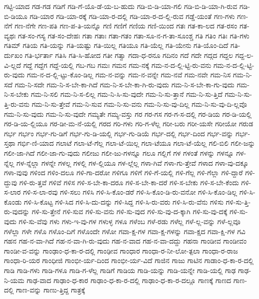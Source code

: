 {ಗಟ್ಟಿ-ಯಾದ
ಗಡ-ಗಡ
ಗಡಿಗೆ
ಗಡಿ-ಗೆ-ಯೊ-ಡೆ-ಯ-ಬ-ಹುದು
ಗಡಿ-ಬಿ-ಡಿ-ಯಾ-ಗಲಿ
ಗಡಿ-ಬಿ-ಡಿ-ಯಾ-ಗಿ-ರುವ
ಗಡಿ-ಬಿ-ಡಿಯೂ
ಗಡಿ-ಯಾರ
ಗಡಿ-ಯಾ-ರಕ್ಕೆ
ಗಡಿ-ಯಾ-ರ-ದಲ್ಲಿ
ಗಡಿ-ಯಾ-ರ-ದ-ಲ್ಲಿ-ರುವ
ಗಡ್ಡೆ-ಯಂತೆ
ಗಣ-ಗಳು
ಗಣ-ನೆಗೆ
ಗಣ-ನೆಗೇ
ಗಣ-ಪತಿ
ಗಣ-ಪ-ತಿ-ಯನ್ನೊ
ಗಣಿ
ಗಣಿಗೆ
ಗಣಿಯ
ಗಣಿ-ಯಿಂದ
ಗತಃ
ಗತ-ಕಾ-ಲದ
ಗತ-ರಸಂ
ಗತ-ವ್ಯಥಃ
ಗತ-ಸಂ-ಗಸ್ಯ
ಗತ-ಸಂ-ದೇಹಃ
ಗತಾ
ಗತಾಃ
ಗತಾ-ಗತಂ
ಗತಾ-ಸೂ-ನ-ಗ-ತಾ-ಸೂಂಶ್ಚ
ಗತಿ
ಗತಿಂ
ಗತಿಃ
ಗತಿ-ಗಳು
ಗತಿಮ್
ಗತಿಯ
ಗತಿ-ಯನ್ನು
ಗತಿ-ಯಷ್ಟು
ಗತಿ-ಯಿಲ್ಲ
ಗತಿಯೂ
ಗತಿ-ಯೆಲ್ಲ
ಗತಿ-ಯೇನು
ಗತಿ-ಯೊಂ-ದಿದೆ
ಗತಿ-ರ್ದುಖಂ
ಗತಿ-ರ್ಭರ್ತಾ
ಗತಿಸಿ
ಗತಿ-ಸಿ-ಹೋದ
ಗತೀ
ಗತ್ವಾ
ಗದಾ-ಧ-ರನೂ
ಗದಿನಂ
ಗದೆ
ಗದೇ
ಗದ್ಗದ
ಗದ್ದಲ
ಗದ್ದ-ಲ-ವಿ-ಲ್ಲದೆ
ಗದ್ದೆ
ಗದ್ದೆಗ
ಗದ್ದೆ-ಯಲ್ಲಿ
ಗಬ-ಗಬ
ಗಮಃ
ಗಮನ
ಗಮ-ನಕ್ಕೆ
ಗಮ-ನ-ದ-ಲ್ಲಿ-ಟ್ಟಿ-ರು-ವನು
ಗಮ-ನ-ದ-ಲ್ಲಿ-ಟ್ಟಿ-ರು-ವುದು
ಗಮ-ನ-ದ-ಲ್ಲಿ-ಟ್ಟು-ಕೊಂ-ಡಿಲ್ಲ
ಗಮ-ನ-ವನ್ನು
ಗಮ-ನ-ವನ್ನೇ
ಗಮ-ನವೆ
ಗಮ-ನವೇ
ಗಮ-ನಿಸ
ಗಮ-ನಿ-ಸದೆ
ಗಮ-ನಿ-ಸದೇ
ಗಮ-ನಿ-ಸ-ಬೇ-ಕಾ-ಗಿದೆ
ಗಮ-ನಿ-ಸ-ಬೇ-ಕಾ-ಗಿ-ರು-ವುದು
ಗಮ-ನಿ-ಸ-ಬೇ-ಕಾ-ಗು-ವುದು
ಗಮ-ನಿ-ಸ-ಬೇಕು
ಗಮ-ನಿ-ಸಲಿ
ಗಮ-ನಿ-ಸ-ಲಿಲ್ಲ
ಗಮ-ನಿ-ಸಿ-ಸು-ವುದೇ
ಗಮ-ನಿ-ಸು-ತ್ತಾನೆ
ಗಮ-ನಿ-ಸು-ತ್ತಿದೆ
ಗಮ-ನಿ-ಸು-ತ್ತಿ-ರು-ವನು
ಗಮ-ನಿ-ಸು-ತ್ತೇವೆ
ಗಮ-ನಿ-ಸುವ
ಗಮ-ನಿ-ಸು-ವನು
ಗಮ-ನಿ-ಸು-ವು-ದಿಲ್ಲ
ಗಮ-ನಿ-ಸು-ವು-ದಿ-ಲ್ಲವೊ
ಗಮ-ನಿ-ಸು-ವುದು
ಗಮ-ನಿ-ಸು-ವುದೇ
ಗಮ್ಯತೇ
ಗಮ್ಯ-ವಸ್ತು
ಗರ
ಗರ-ಗಸ
ಗರ-ಗ-ಸ-ದಲ್ಲಿ
ಗರ-ಡಿಯ
ಗರ-ಡಿ-ಯಲ್ಲಿ
ಗರ-ಡಿ-ಯ-ಲ್ಲಿಯೂ
ಗರ-ಡೀ-ಮ-ನೆ-ಯಲ್ಲಿ
ಗರದ
ಗರಿ-ಗಳು
ಗರಿ-ಗ-ಳೆಲ್ಲ
ಗರೀ-ಬರು
ಗರೀ-ಯಸೇ
ಗರೀಯೋ
ಗರುಡ
ಗರ್ಭ
ಗರ್ಭಂ
ಗರ್ಭ-ಗು-ಡಿಗೆ
ಗರ್ಭ-ಗು-ಡಿ-ಯಲ್ಲಿ
ಗರ್ಭ-ಗು-ಡಿಯೆ
ಗರ್ಭ-ದಲ್ಲಿ
ಗರ್ಭ-ದಿಂದ
ಗರ್ಭ-ವನ್ನು
ಗರ್ಭ-ಸ್ತಥಾ
ಗರ್ಭಿ-ಣಿ-ಯಾದ
ಗಲಾಟೆ
ಗಲಾ-ಟೆ-ಗೆಲ್ಲ
ಗಲಾ-ಟೆ-ಯಿಲ್ಲ
ಗಲಾ-ಟೆಯೂ
ಗಲಾ-ಟೆ-ಯೆಲ್ಲ
ಗಲಿ-ಬಿಲಿ
ಗಲೀ-ಜನ್ನು
ಗಲೀ-ಜಾ-ಗಿದೆ
ಗಲೀ-ಜಾ-ಗು-ವುದು
ಗಲೀಜು
ಗಲೀ-ಜು-ಗಳನ್ನೂ
ಗಲೂ
ಗಲ್ಲಿಗೆ
ಗಳ
ಗಳಂತೆ
ಗಳನ್ನು
ಗಳನ್ನೂ
ಗಳ-ನ್ನೆಲ್ಲ
ಗಳ-ನ್ನೆಲ್ಲಾ
ಗಳನ್ನೇ
ಗಳಲ್ಲ
ಗಳಲ್ಲಿ
ಗಳ-ಲ್ಲಿಯೂ
ಗಳ-ಲ್ಲೆಲ್ಲ
ಗಳಾ-ಗಿವೆ
ಗಳಾ-ಗು-ತ್ತೇವೆ
ಗಳಾದ
ಗಳಾ-ವು-ದಕ್ಕೂ
ಗಳಾ-ವುವು
ಗಳಿಂದ
ಗಳಿಂ-ದಲೂ
ಗಳಿ-ಗಾ-ದರೋ
ಗಳಿಗೂ
ಗಳಿಗೆ
ಗಳಿ-ಗೆ-ಯಲ್ಲಿ
ಗಳಿ-ಗೆಲ್ಲ
ಗಳಿ-ಗೆಲ್ಲಾ
ಗಳಿ-ದ್ದಾರೆ
ಗಳಿ-ದ್ದುವು
ಗಳಿ-ರು-ತ್ತವೆ
ಗಳಿವೆ
ಗಳಿಸ
ಗಳಿ-ಸ-ಬೇ-ಕಾ-ದರೂ
ಗಳಿ-ಸ-ಬೇ-ಕಾ-ದರೆ
ಗಳಿ-ಸ-ಬೇಕು
ಗಳಿ-ಸ-ಬೇ-ಕೆಂದು
ಗಳಿ-ಸ-ಲಾರ
ಗಳಿ-ಸ-ಲಾ-ರವು
ಗಳಿ-ಸಲು
ಗಳಿಸಿ
ಗಳಿ-ಸಿ-ಕೊಂ-ಡರೆ
ಗಳಿ-ಸಿ-ಕೊಂ-ಡಿ-ರು-ವನೋ
ಗಳಿ-ಸಿ-ಕೊಂ-ಡಿಲ್ಲ
ಗಳಿ-ಸಿ-ಕೊಂಡು
ಗಳಿ-ಸಿ-ಕೊಟ್ಟ
ಗಳಿ-ಸಿದ
ಗಳಿ-ಸಿ-ದು-ದನ್ನು
ಗಳಿ-ಸಿದ್ದ
ಗಳಿ-ಸಿ-ರು-ವರು
ಗಳಿ-ಸಿ-ರು-ವೆನು
ಗಳಿಸು
ಗಳಿ-ಸು-ತ್ತಿ-ರು-ವುದನ್ನು
ಗಳಿ-ಸು-ತ್ತೇನೆ
ಗಳಿ-ಸುವ
ಗಳಿ-ಸು-ವನು
ಗಳಿ-ಸು-ವುದ
ಗಳಿ-ಸು-ವು-ದ-ಕ್ಕಾಗಿ
ಗಳಿ-ಸು-ವು-ದಕ್ಕೆ
ಗಳಿ-ಸು-ವುದು
ಗಳಿ-ಸು-ವೆವು
ಗಳು
ಗಳು-ಇ-ವು-ಗಳ
ಗಳುಳ್ಳ
ಗಳೂ
ಗಳೆಂಬ
ಗಳೆ-ರಡು
ಗಳೆಲ್ಲ
ಗಳೆ-ಲ್ಲ-ವನ್ನು
ಗಳೆ-ಲ್ಲವೂ
ಗಳೆಲ್ಲಾ
ಗಳೇ
ಗಳೊ
ಗಳೊಂ-ದಿಗೆ
ಗಳೊಂದೇ
ಗಳೋ
ಗವಾ-ಕ್ಷ-ಗಳ
ಗವಾ-ಕ್ಷ-ಗಳನ್ನು
ಗವಾ-ಕ್ಷದ
ಗವಾ-ಕ್ಷಿ-ಗಳ
ಗವಿ
ಗಹನ
ಗಹ-ನ-ವಾ-ಗಿದೆ
ಗಹ-ನ-ವಾ-ಗಿ-ರು-ವುದು
ಗಹ-ನ-ವಾದ
ಗಹ-ನ-ವಾ-ದದ್ದು
ಗಹನಾ
ಗಾಂಡೀವ
ಗಾಂಡೀವಂ
ಗಾಂಡೀ-ವ-ವನ್ನು
ಗಾಂಢಾಂ-ಧ-ಕಾ-ರ-ದಲ್ಲಿ
ಗಾಂಢೀವ
ಗಾಂಧಾರ
ಗಾಂಧಾ-ರ-ನೀ-ಲೋ-ತ್ಪಲಾ
ಗಾಂಧಾ-ರ-ರಾಜ
ಗಾಂಧಾ-ರಿ-ಯರ
ಗಾಂಧೀಜಿ
ಗಾಂಭೀ-ರ್ಯ-ದಿಂದ
ಗಾಂಭೀ-ರ್ಯ-ವಿದೆ
ಗಾಜಿನ
ಗಾಜು
ಗಾಟಿನ
ಗಾಡಾಂ-ಧ-ಕಾ-ರ-ದಲ್ಲಿ
ಗಾಡಿ
ಗಾಡಿ-ಗಳು
ಗಾಡಿ-ಗಳೂ
ಗಾಡಿ-ಗ-ಳೆಲ್ಲ
ಗಾಡಿಗೆ
ಗಾಡಿಯ
ಗಾಡಿ-ಯನ್ನು
ಗಾಡಿ-ಯನ್ನೇ
ಗಾಡಿ-ಯಲ್ಲಿ
ಗಾಢ
ಗಾಢ-ನಿ-ಯಮ
ಗಾಢ-ವಾದ
ಗಾಢಾಂ-ಧ-ಕಾರ
ಗಾಢಾಂ-ಧ-ಕಾ-ರ-ದಲ್ಲಿ
ಗಾಢಾಂ-ಧ-ಕಾ-ರ-ದಲ್ಲೂ
ಗಾಣಕ್ಕೆ
ಗಾಣದ
ಗಾಣ-ದಲ್ಲಿ
ಗಾಣ-ವನ್ನು
ಗಾಣು-ತ್ತಿದ್ದ
ಗಾತ್ರಕ್ಕೆ
}
